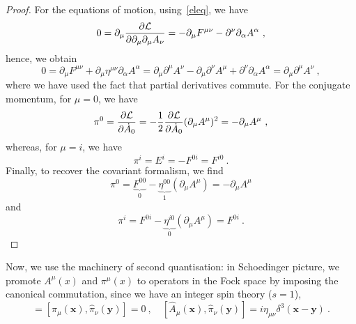     \begin{proof}        
        For the equations of motion, using~\eqref{eleq}, we have 
        \begin{equation*}
            0 = \partial_\mu \frac{\partial\mathcal L}{\partial\partial_\mu \partial_\mu A_\nu} = - \partial_\mu F^{\mu\nu} - \partial^\nu \partial_\alpha A^\alpha ~,
        \end{equation*}
        hence, we obtain 
        \begin{equation*}
            0 = \partial_\mu F^{\mu\nu} + \partial_\mu \eta^{\mu\nu} \partial_\alpha A^\alpha = \partial_\mu \partial^\mu A^\nu - \partial_\mu \partial^\nu A^\mu + \partial^\nu \partial_\alpha A^\alpha = \partial_\mu \partial^\mu A^\nu ~,
        \end{equation*}
        where we have used the fact that partial derivatives commute.
        For the conjugate momentum, for $\mu = 0$, we have
        \begin{equation*}
            \pi^0 = \frac{\partial\mathcal L}{\partial\dot A_0} = - \frac{1}{2} \frac{\partial\mathcal L}{\partial\dot A_0} (\partial_\mu A^\mu)^2 = - \partial_\mu A^\mu  ~,
        \end{equation*}
        whereas, for $\mu = i$, we have
        \begin{equation*}
            \pi^i = E^i = - F^{0i} = F^{i0} ~.
        \end{equation*}
        Finally, to recover the covariant formalism, we find
        \begin{equation*}
            \pi^0 = \underbrace{F^{00}}_0 - \underbrace{\eta^{00}}_1 (\partial_\mu A^\mu) = - \partial_\mu A^\mu 
        \end{equation*}
        and 
        \begin{equation*}
            \pi^i = F^{0i} - \underbrace{\eta^{i0}}_0 (\partial_\mu A^\mu) = F^{0i} ~.
        \end{equation*}
    \end{proof}

    Now, we use the machinery of second quantisation: in Schoedinger picture, we promote $A^\mu(x)$ and $\pi^\mu(x)$ to operators in the Fock space by imposing the canonical commutation, since we have an integer spin theory ($s = 1$), 
    \begin{equation*}
        [\hat A_\mu (\mathbf x), \hat A_\nu (\mathbf y)] = [\hat \pi_\mu (\mathbf x), \hat \pi_\nu (\mathbf y)] = 0 ~, \quad [\hat A_\mu (\mathbf x), \hat \pi_\nu (\mathbf y)] = i \eta_{\mu\nu} \delta^3 (\mathbf x - \mathbf y) ~.
    \end{equation*}

